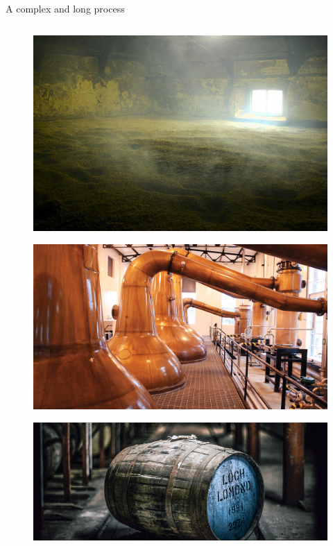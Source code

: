 \documentclass{beamer}
\begin{document}
\begin{frame}{A complex and long process}
\begin{columns}
	
		\begin{column}{0.6\textwidth}
			\begin{figure}[H]
				\begin{center}
					\includegraphics[scale = 0.70]{smoke-dry-barley}
				\end{center}
			\end{figure}
			\begin{figure}[H]
				\begin{center}
					\includegraphics[scale = 0.3]{scotch_stills}
				\end{center}
			\end{figure}
					\begin{figure}[H]
			\begin{center}
				\includegraphics[scale = 0.15]{cask_aging}
			\end{center}
		\end{figure}
	

		\end{column}
		
		
	\end{columns}


\end{frame}
\end{document}
